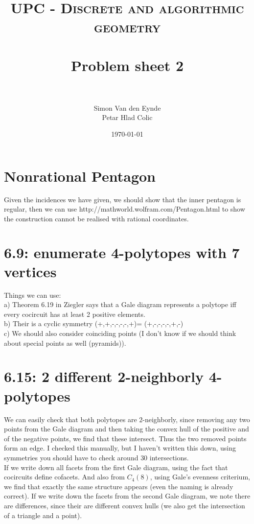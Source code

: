 \documentclass[paper=a4, fontsize=11pt]{scrartcl} %
\title{	
\normalfont \normalsize 
\textsc{UPC - Discrete and algorithmic geometry} \\ [25pt] %
\horrule{0.5pt} \\[0.4cm] %
\huge Problem sheet 2  \\ %
\horrule{2pt} \\[0.5cm] %
}
\author{Simon Van den Eynde \\ Petar Hlad Colic} %
\date{\normalsize\today} %
\theoremstyle{plain}
\begin{document}
\maketitle %

\section{Nonrational Pentagon}
Given the incidences we have given, we should show that the inner pentagon is regular, then we can use http://mathworld.wolfram.com/Pentagon.html to show the construction cannot be realised with rational coordinates.

\section{6.9: enumerate 4-polytopes with 7 vertices}
Things we can use: \\
a) Theorem 6.19 in Ziegler says that a Gale diagram represents a polytope iff every cocircuit has at least 2 positive elements.\\

b) Their is a cyclic symmetry (+,+,-,-,-,-,+)= (+,-,-,-,-,+,-)\\

c) We should also consider coinciding points (I don't know if we should think about special points as well (pyramids)).

\section{6.15: 2 different 2-neighborly 4-polytopes}
We can easily check that both polytopes are $2$-neighborly, since removing any two points from the Gale diagram and then taking the convex hull of the positive and of the negative points, we find that these intersect. Thus the two removed points form an edge. I checked this manually, but I haven't written this down, using symmetries you should have to check around $30$ intersections.\\

If we write down all facets from the first Gale diagram, using the fact that cocircuits define cofacets. And also from $C_4(8)$, using Gale's evenness criterium, we find that exactly the same structure appears (even the naming is already correct). If we write down the facets from the second Gale diagram, we note there are differences, since their are different convex hulls (we also get the intersection of a triangle and a point).\\
\end{document}
